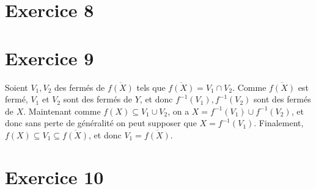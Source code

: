     \section{Exercice 8}
    
    \section{Exercice 9}
        Soient $V_1, V_2$ des fermés de $\overline{f(X)}$ tels que $\overline{f(X)} = V_1 \cap V_2$. Comme $\overline{f(X)}$ est fermé, $V_1$ et $V_2$ sont des fermés de $Y$, et donc $f^{-1}(V_1), f^{-1}(V_2)$ sont des fermés de $X$. Maintenant comme $f(X) \subseteq V_1 \cup V_2$, on a $X = f^{-1}(V_1) \cup f^{-1}(V_2)$, et donc sans perte de généralité on peut supposer que $X = f^{-1}(V_1)$. Finalement, $f(X) \subseteq V_1 \subseteq \overline{f(X)}$, et donc $V_1 = \overline{f(X)}$.

    \section{Exercice 10}
